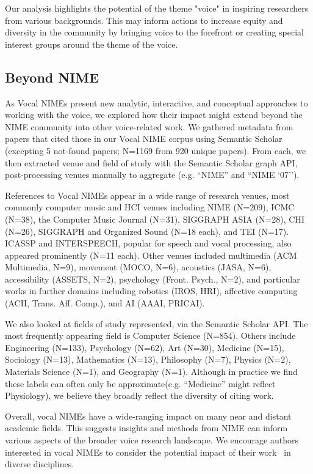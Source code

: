 \documentclass[sigconf]{nimeart}
\begin{document}
Our analysis highlights the potential of the theme "voice" in inspiring researchers from various backgrounds. This may inform actions to increase equity and diversity in the community by bringing voice to the forefront or creating special interest groups around the theme of the voice.

\subsection{Beyond NIME~}\label{beyond-nime}

As Vocal NIMEs present new analytic, interactive, and conceptual approaches to working with the voice, we explored how their impact might extend beyond the NIME community into other voice-related work. We gathered metadata from papers that cited those in our Vocal NIME corpus using Semantic Scholar (excepting 5 not-found papers; N=1169 from 920 unique papers). From each, we then extracted venue and field of study with the Semantic Scholar graph API, post-processing venues manually to aggregate (e.g. ``NIME'' and ``NIME `07'').

References to Vocal NIMEs appear in a wide range of research venues, most commonly computer music and HCI venues including NIME (N=209), ICMC (N=38), the Computer Music Journal (N=31), SIGGRAPH ASIA (N=28), CHI (N=26), SIGGRAPH and Organized Sound (N=18 each), and TEI (N=17). ICASSP and INTERSPEECH, popular for speech and vocal processing, also appeared prominently (N=11 each). Other venues included multimedia (ACM Multimedia, N=9), movement (MOCO, N=6), acoustics (JASA, N=6), accessibility (ASSETS, N=2), psychology (Front. Psych., N=2), and particular works in further domains including robotics (IROS, HRI), affective computing (ACII, Trans. Aff. Comp.), and AI (AAAI, PRICAI).

We also looked at fields of study represented, via the Semantic Scholar API. The most frequently appearing field is Computer Science (N=854). Others include Engineering (N=133), Psychology (N=62), Art (N=30), Medicine (N=15), Sociology (N=13), Mathematics (N=13), Philosophy (N=7), Physics (N=2), Materials Science (N=1), and Geography (N=1). Although in practice we find these labels can often only be approximate(e.g. ``Medicine'' might reflect Physiology), we believe they broadly reflect the diversity of citing work.

Overall, vocal NIMEs have a wide-ranging impact on many near and distant academic fields. This suggests insights and methods from NIME can inform various aspects of the broader voice research landscape. We encourage authors interested in vocal NIMEs to consider the potential impact of their work~ in diverse disciplines.
\end{document}
